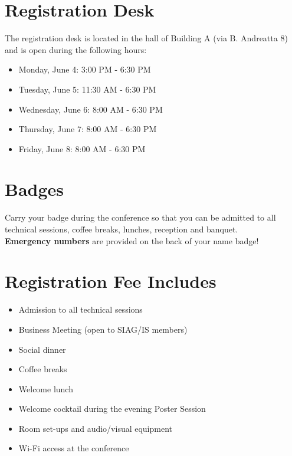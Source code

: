 \newpage
\section*{Registration Desk}
The registration desk is located in the hall of Building A (via B. Andreatta 8) and is open during the following hours:

\bigskip

\begin{itemize}
  \item[] Monday, June 4: 3:00 PM - 6:30 PM
  \item[] Tuesday, June 5: 11:30 AM - 6:30 PM
  \item[] Wednesday, June 6: 8:00 AM - 6:30 PM
  \item[] Thursday, June 7: 8:00 AM - 6:30 PM
  \item[] Friday, June 8: 8:00 AM - 6:30 PM
\end{itemize}

\section*{Badges} Carry your badge during the conference so that you can be admitted to all technical sessions, coffee breaks, lunches, reception and banquet.\\
\textbf{Emergency numbers} are provided on the back of your name badge! 
\section*{Registration Fee Includes}

\bigskip

\begin{itemize}
  \item[] Admission to all technical sessions
  \item[] Business Meeting (open to SIAG/IS members)
  \item[] Social dinner
  \item[] Coffee breaks 
  \item[] Welcome lunch 
  \item[] Welcome cocktail during the evening Poster Session
  \item[] Room set-ups and audio/visual equipment
  \item[] Wi-Fi access at the conference
\end{itemize}%


